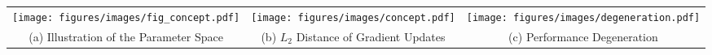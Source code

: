 \begin{figure*}[t]
\small
\centering
\vspace{-0.05in}
\begin{tabular}{c c c}
    \small    
    \hspace{-0.15in}
    \texttt{[image: figures/images/fig\_concept.pdf]} &
    \hspace{-0.2in} \texttt{[image: figures/images/concept.pdf]} & 
    \hspace{-0.15in}
    \texttt{[image: figures/images/degeneration.pdf]}
    \\
    \hspace{-0.1in} (a) Illustration of the Parameter Space &
    \hspace{-0.1in} (b) $L_2$ Distance of Gradient Updates &
    \hspace{-0.1in} (c) Performance Degeneration

\end{tabular}
\vspace{-0.1in}
\caption{\small{\textbf{Challenges of Agnostic Personalized Federated Learning Scenarios}} (a) illustrates label and domain heterogeneity in parameter space. (b) shows the $L_2$ distance of the gradient updates from that of model trained on MNIST Partition 1. (c) shows performance degradation on MNIST partition 1 caused by the label and domain heterogeneity while performing federated learning. }
\label{fig:concept}
\vspace{-0.15in}
\end{figure*}
